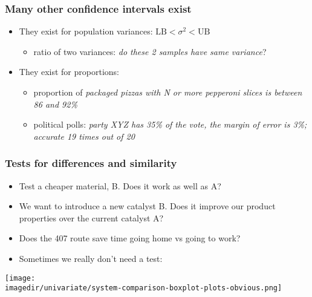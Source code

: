 \begin{frame}\frametitle{Many other confidence intervals exist}
	\begin{itemize}
		\item	They exist for population variances: $\text{LB} < \sigma^2 < \text{UB}$
		\begin{itemize}
			\item	ratio of two variances: \emph{do these 2 samples have same variance}?
		\end{itemize}

		\vspace{12pt}
		\item	They exist for proportions:
		\begin{itemize}
			\item	proportion of \emph{packaged pizzas with N or more pepperoni slices is between 86 and 92\%}
			\item	political polls: \emph{party XYZ has 35\% of the vote, the margin of error is 3\%; accurate 19 times out of 20}
		\end{itemize}
	\end{itemize}
\end{frame}

\begin{frame}\frametitle{Tests for differences and similarity}
	\begin{itemize}
		\item	Test a cheaper material, B. Does it work as well as A?
		\item	We want to introduce a new catalyst B. Does it improve our product properties over the current catalyst A?
		\item	Does the 407 route save time going home vs going to work?
	\end{itemize}
	\begin{itemize}
		\item	Sometimes we really don't need a test:
	\end{itemize}
	\begin{center}
		\texttt{[image: \\imagedir/univariate/system-comparison-boxplot-plots-obvious.png]}
	\end{center}
\end{frame}

